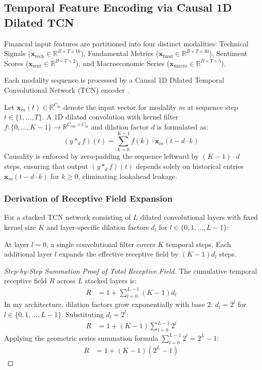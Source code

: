 \subsection{Temporal Feature Encoding via Causal 1D Dilated TCN}
\label{subsec:ch4_tcn_encoder}

Financial input features are partitioned into four distinct modalities: Technical Signals ($\mathbf{x}_{\text{tech}} \in \mathbb{R}^{B \times T \times 16}$), Fundamental Metrics ($\mathbf{x}_{\text{fund}} \in \mathbb{R}^{B \times T \times 30}$), Sentiment Scores ($\mathbf{x}_{\text{sent}} \in \mathbb{R}^{B \times T \times 2}$), and Macroeconomic Series ($\mathbf{x}_{\text{macro}} \in \mathbb{R}^{B \times T \times 5}$).

Each modality sequence is processed by a Causal 1D Dilated Temporal Convolutional Network (TCN) encoder \citep{bai2018empirical}.

Let $\mathbf{x}_m(t) \in \mathbb{R}^{C_{\text{in}}}$ denote the input vector for modality $m$ at sequence step $t \in \{1, \dots, T\}$. A 1D dilated convolution with kernel filter $f: \{0, \dots, K-1\} \to \mathbb{R}^{C_{\text{out}} \times C_{\text{in}}}$ and dilation factor $d$ is formulated as:
\begin{equation}
(y *_{d} f)(t) = \sum_{k=0}^{K-1} f(k) \cdot \mathbf{x}_m(t - d \cdot k)
\label{eq:ch4_dilated_conv}
\end{equation}
Causality is enforced by zero-padding the sequence leftward by $(K-1) \cdot d$ steps, ensuring that output $(y *_{d} f)(t)$ depends solely on historical entries $\mathbf{x}_m(t - d \cdot k)$ for $k \ge 0$, eliminating lookahead leakage.

\subsubsection{Derivation of Receptive Field Expansion}
For a stacked TCN network consisting of $L$ dilated convolutional layers with fixed kernel size $K$ and layer-specific dilation factors $d_l$ for $l \in \{0, 1, \dots, L-1\}$:

At layer $l=0$, a single convolutional filter covers $K$ temporal steps. Each additional layer $l$ expands the effective receptive field by $(K-1) d_l$ steps.

\begin{proof}[Step-by-Step Summation Proof of Total Receptive Field]
The cumulative temporal receptive field $R$ across $L$ stacked layers is:
\begin{align}
R &= 1 + \sum_{l=0}^{L-1} (K - 1) d_l
\label{eq:ch4_receptive_field_general}
\end{align}
In my architecture, dilation factors grow exponentially with base 2: $d_l = 2^l$ for $l \in \{0, 1, \dots, L-1\}$. Substituting $d_l = 2^l$:
\begin{align}
R &= 1 + (K - 1) \sum_{l=0}^{L-1} 2^l
\end{align}
Applying the geometric series summation formula $\sum_{l=0}^{L-1} 2^l = 2^L - 1$:
\begin{align}
R &= 1 + (K - 1)(2^L - 1)
\label{eq:ch4_receptive_field_proof}
\end{align}
\end{proof}

